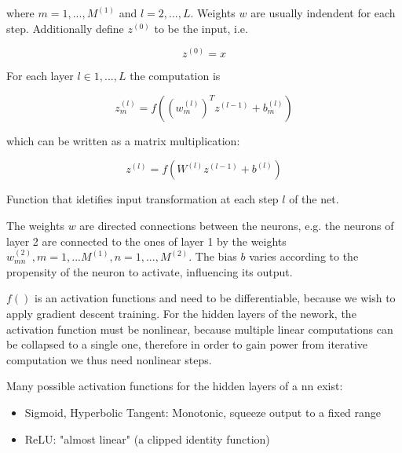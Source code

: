 \noindent where $m=1,...,M^{(1)}$ and $l=2,...,L$. Weights $w$ are usually indendent for each step. Additionally define $z^{(0)}$ to be the input, i.e.

\begin{Equation}[H]
	\centering
	\begin{equation}
	z^{(0)} = x
	\end{equation}
	\label{eq:hommatrix}
\end{Equation}

\noindent For each layer $l \in 1,...,L$ the computation is

\begin{Equation}[H]
	\centering
	\begin{equation}
		z^{(l)}_m = f( (w^{(l)}_m)^T z^{(l-1)} + b^{(l)}_m)
	\end{equation}
	\label{eq:mathmodel}
\end{Equation}

\noindent which can be written as a matrix multiplication:

\begin{Equation}[H]
	\centering
	\begin{equation}
		z^{(l)} = f( W^{(l)} z^{(l-1)} + b^{(l)})
	\end{equation}
	\caption[Forward propagation.]{Function that idetifies input transformation at each step $l$ of the net.}
	\label{eq:activationfun}
\end{Equation}

\noindent The weights $w$ are directed connections between the neurons, e.g. the neurons of layer 2 are connected to the ones of layer 1 by the weights $w^{(2)}_{mn}, m=1,...M^{(1)}, n=1,...,M^{(2)}$. The bias $b$ varies according to the propensity of the neuron to activate, influencing its output. 

\noindent $f()$ is an activation functions and need to be differentiable, because we wish to apply gradient descent training. For the hidden layers of the nework, the activation function must be nonlinear, because multiple linear computations can be collapsed to a single one, therefore in order to gain power from iterative computation we thus need nonlinear steps.

\noindent Many possible activation functions for the hidden layers of a \gls{nn} exist:
\begin{itemize}
	\item Sigmoid, Hyperbolic Tangent: Monotonic, squeeze output to a fixed range
	\item ReLU: "almost linear" (a clipped identity function)
\end{itemize}

